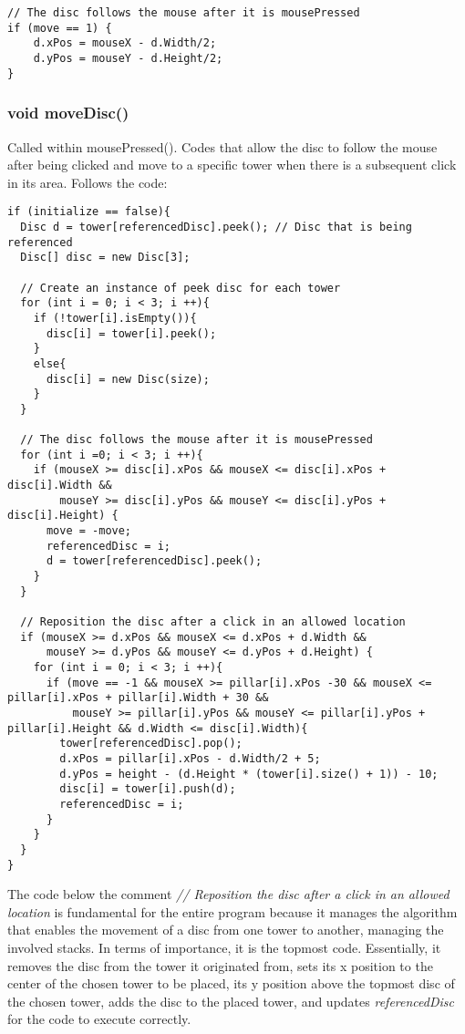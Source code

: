 \documentclass[
	12pt,				%
	oneside,			%
	a4paper,			%
	english,			%
	brazil,				%
	]{abntex2}
\begin{document}
{\begin{itshape}
\begin{verbatim}
// The disc follows the mouse after it is mousePressed
if (move == 1) {
    d.xPos = mouseX - d.Width/2;
    d.yPos = mouseY - d.Height/2;
} 
\end{verbatim}
\end{itshape}

\subsubsection{void moveDisc()}
Called within mousePressed(). Codes that allow the disc to follow the mouse after being clicked and move to a specific tower when there is a subsequent click in its area. Follows the code:

\begin{itshape}
\begin{verbatim}
if (initialize == false){
  Disc d = tower[referencedDisc].peek(); // Disc that is being referenced
  Disc[] disc = new Disc[3];

  // Create an instance of peek disc for each tower
  for (int i = 0; i < 3; i ++){
    if (!tower[i].isEmpty()){
      disc[i] = tower[i].peek();
    }
    else{
      disc[i] = new Disc(size);
    }
  }

  // The disc follows the mouse after it is mousePressed
  for (int i =0; i < 3; i ++){
    if (mouseX >= disc[i].xPos && mouseX <= disc[i].xPos + disc[i].Width &&
        mouseY >= disc[i].yPos && mouseY <= disc[i].yPos + disc[i].Height) {
      move = -move;
      referencedDisc = i;
      d = tower[referencedDisc].peek(); 
    }
  }

  // Reposition the disc after a click in an allowed location
  if (mouseX >= d.xPos && mouseX <= d.xPos + d.Width &&
      mouseY >= d.yPos && mouseY <= d.yPos + d.Height) {
    for (int i = 0; i < 3; i ++){
      if (move == -1 && mouseX >= pillar[i].xPos -30 && mouseX <= pillar[i].xPos + pillar[i].Width + 30 &&
          mouseY >= pillar[i].yPos && mouseY <= pillar[i].yPos + pillar[i].Height && d.Width <= disc[i].Width){
        tower[referencedDisc].pop();
        d.xPos = pillar[i].xPos - d.Width/2 + 5;
        d.yPos = height - (d.Height * (tower[i].size() + 1)) - 10;  
        disc[i] = tower[i].push(d); 
        referencedDisc = i;
      }
    }
  }
}
\end{verbatim}
\end{itshape}

The code below the comment \textit{// Reposition the disc after a click in an allowed location} is fundamental for the entire program because it manages the algorithm that enables the movement of a disc from one tower to another, managing the involved stacks. In terms of importance, it is the topmost code. Essentially, it removes the disc from the tower it originated from, sets its x position to the center of the chosen tower to be placed, its y position above the topmost disc of the chosen tower, adds the disc to the placed tower, and updates \textit{referencedDisc} for the code to execute correctly.

}
\end{document}
